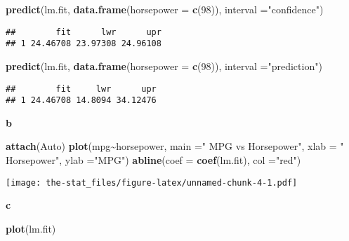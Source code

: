 \documentclass[
]{article}
\newenvironment{Shaded}{\begin{snugshade}}{\end{snugshade}}
\newcommand{\AttributeTok}[1]{\textcolor[rgb]{0.13,0.29,0.53}{#1}}
\newcommand{\DecValTok}[1]{\textcolor[rgb]{0.00,0.00,0.81}{#1}}
\newcommand{\FunctionTok}[1]{\textcolor[rgb]{0.13,0.29,0.53}{\textbf{#1}}}
\newcommand{\NormalTok}[1]{#1}
\newcommand{\SpecialCharTok}[1]{\textcolor[rgb]{0.81,0.36,0.00}{\textbf{#1}}}
\newcommand{\StringTok}[1]{\textcolor[rgb]{0.31,0.60,0.02}{#1}}
\begin{document}
\begin{Shaded}
\begin{Highlighting}[]
\FunctionTok{predict}\NormalTok{(lm.fit, }\FunctionTok{data.frame}\NormalTok{(}\AttributeTok{horsepower =} \FunctionTok{c}\NormalTok{(}\DecValTok{98}\NormalTok{)), }\AttributeTok{interval =}\StringTok{"confidence"}\NormalTok{)}
\end{Highlighting}
\end{Shaded}

\begin{verbatim}
##        fit      lwr      upr
## 1 24.46708 23.97308 24.96108
\end{verbatim}

\begin{Shaded}
\begin{Highlighting}[]
\FunctionTok{predict}\NormalTok{(lm.fit, }\FunctionTok{data.frame}\NormalTok{(}\AttributeTok{horsepower =} \FunctionTok{c}\NormalTok{(}\DecValTok{98}\NormalTok{)), }\AttributeTok{interval =}\StringTok{"prediction"}\NormalTok{)}
\end{Highlighting}
\end{Shaded}

\begin{verbatim}
##        fit     lwr      upr
## 1 24.46708 14.8094 34.12476
\end{verbatim}

\textbf{b}

\begin{Shaded}
\begin{Highlighting}[]
\FunctionTok{attach}\NormalTok{(Auto)}
\FunctionTok{plot}\NormalTok{(mpg}\SpecialCharTok{\textasciitilde{}}\NormalTok{horsepower, }\AttributeTok{main =}\StringTok{" MPG vs Horsepower"}\NormalTok{, }\AttributeTok{xlab =} \StringTok{" Horsepower"}\NormalTok{, }\AttributeTok{ylab =}\StringTok{"MPG"}\NormalTok{)}
\FunctionTok{abline}\NormalTok{(}\AttributeTok{coef =} \FunctionTok{coef}\NormalTok{(lm.fit), }\AttributeTok{col =}\StringTok{"red"}\NormalTok{)}
\end{Highlighting}
\end{Shaded}

\texttt{[image: the-stat\_files/figure-latex/unnamed-chunk-4-1.pdf]}

\textbf{c}

\begin{Shaded}
\begin{Highlighting}[]
\FunctionTok{plot}\NormalTok{(lm.fit)}
\end{Highlighting}
\end{Shaded}
\end{document}
